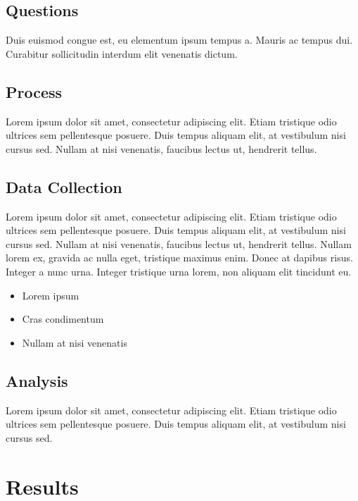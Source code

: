 \documentclass[11pt, a4paper]{resources/JTH}
\begin{document}
    \subsection{Questions}
    
        Duis euismod congue est, eu elementum ipsum tempus a. Mauris ac tempus dui. Curabitur sollicitudin interdum elit venenatis dictum. \citep{beck2003test}

    \subsection{Process}
    
        Lorem ipsum dolor sit amet, consectetur adipiscing elit. Etiam tristique odio ultrices sem pellentesque posuere. Duis tempus aliquam elit, at vestibulum nisi cursus sed. Nullam at nisi venenatis, faucibus lectus ut, hendrerit tellus.

    \subsection{Data Collection}
    
        Lorem ipsum dolor sit amet, consectetur adipiscing elit. Etiam tristique odio ultrices sem pellentesque posuere. Duis tempus aliquam elit, at vestibulum nisi cursus sed. Nullam at nisi venenatis, faucibus lectus ut, hendrerit tellus. Nullam lorem ex, gravida ac nulla eget, tristique maximus enim. Donec at dapibus risus. Integer a nunc urna. Integer tristique urna lorem, non aliquam elit tincidunt eu.
        
        \begin{itemize}
            \item Lorem ipsum
            \item Cras condimentum
            \item Nullam at nisi venenatis
        \end{itemize}

    \subsection{Analysis}
    
        Lorem ipsum dolor sit amet, consectetur adipiscing elit. Etiam tristique odio ultrices sem pellentesque posuere. Duis tempus aliquam elit, at vestibulum nisi cursus sed.

\section{Results}
\end{document}
